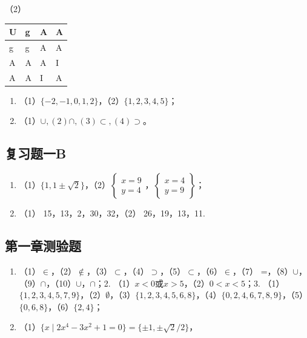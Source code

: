 （2）

{\def\LTcaptype{none} %
\begin{longtable}[]{@{}llll@{}}
\toprule\noalign{}
U & g & A & A \\
\midrule\noalign{}
\endhead
\bottomrule\noalign{}
\endlastfoot
g & g & A & A \\
A & A & A & I \\
A & A & I & A \\
\end{longtable}
}

\begin{enumerate}[start=5]
\item
  （1）\(\{-2, -1, 0, 1, 2\}\)，（2）\(\{1, 2, 3, 4, 5\}\)；
\item
  （1）\(\cup, (2) \cap, (3) \subset, (4) \supset\)。
\end{enumerate}

\subsection{复习题一B}

\begin{enumerate}
\item
  （1）\(\{1, 1 \pm \sqrt{2}\}\)，（2）\(\left\{ \begin{array}{l} x = 9 \\ y = 4 \end{array} \right.\)，\(\left\{ \begin{array}{l} x = 4 \\ y = 9 \end{array} \right\}\)；
\item
  （1） 15，13，2，30，32，（2） 26，19，13，11.
\end{enumerate}

\subsection{第一章测验题}

\begin{enumerate}
\item
  （1）\(\in\)，（2）\(\notin\)，（3）\(\subset\)，（4）\(\supset\)，（5）\(\subset\)，（6）\(\in\)，（7）
  =，（8）\(\cup\)，（9）\(\cap\)，（10）\(\cup\)，\(\cap\)；2.
  （1）\(x < 0\)或\(x > 5\)，（2）\(0<x<5\)；3.
  （1）\(\{1, 2, 3, 4, 5, 7, 9\}\)，（2）\(\emptyset\)，（3）\(\{1, 2, 3, 4, 5, 6, 8\}\)，（4）\(\{0, 2, 4, 6, 7, 8, 9\}\)，（5）\(\{0,6,8\}\)，（6）\(\{2, 4\}\)；
\item
  （1）\(\{x\mid 2x^4-3x^2+1=0\} = \{\pm 1, \pm \sqrt{2}/2\}\)，
\end{enumerate}

